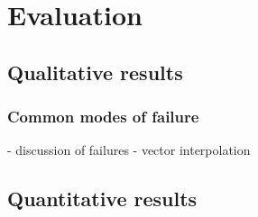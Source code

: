 \chapter{Evaluation}
\section{Qualitative results}
\subsection{Common modes of failure}
- discussion of failures
- vector interpolation
\section{Quantitative results}
